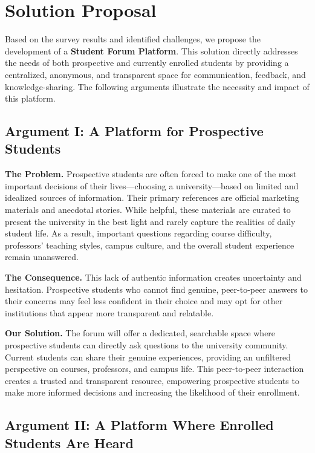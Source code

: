 \section{Solution Proposal}

Based on the survey results and identified challenges, we propose the development 
of a \textbf{Student Forum Platform}. This solution directly addresses the needs 
of both prospective and currently enrolled \cite{ejimed2023role} students by providing a centralized, 
anonymous, and transparent space for communication, feedback, and knowledge-sharing. 
The following arguments illustrate the necessity and impact of this platform.

\subsection{Argument I: A Platform for Prospective Students}

\textbf{The Problem.} 
Prospective students are often forced to make one of the most important decisions 
of their lives---choosing a university---based on limited and idealized sources 
of information. Their primary references are official marketing materials and 
anecdotal stories. While helpful, these materials are curated to present the 
university in the best light and rarely capture the realities of daily student 
life. As a result, important questions regarding course difficulty, professors’ 
teaching styles, campus culture, and the overall student experience remain 
unanswered.  

\textbf{The Consequence.}  
This lack of authentic information creates uncertainty and hesitation. Prospective 
students who cannot find genuine, peer-to-peer answers to their concerns may feel 
less confident in their choice and may opt for other institutions that appear more 
transparent and relatable.  

\textbf{Our Solution.}  
The forum will offer a dedicated, searchable space where prospective students can 
directly ask questions to the university community. Current students can share 
their genuine experiences, providing an unfiltered perspective on courses, 
professors, and campus life. This peer-to-peer interaction creates a trusted and 
transparent resource, empowering prospective students to make more informed 
decisions and increasing the likelihood of their enrollment.

\subsection{Argument II: A Platform Where Enrolled Students Are Heard}

